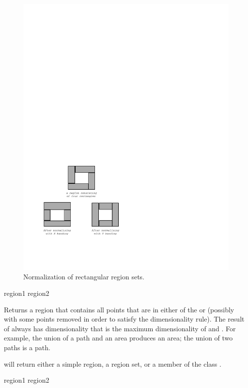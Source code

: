 \begin{figure}
\centerline{\includegraphics{region-normalization}}
\caption{Normalization of rectangular region sets.}
\end{figure}


 {region1 region2}

Returns a region that contains all points that are in either of the
  or  (possibly with some points removed
in order to satisfy the dimensionality rule).  The result of 
always has dimensionality that is the maximum dimensionality of 
and .  For example, the union of a path and an area produces an
area; the union of two paths is a path.

 will return either a simple region, a region set, or a member
of the class .

\MayCaptureInputs

 {region1 region2}

